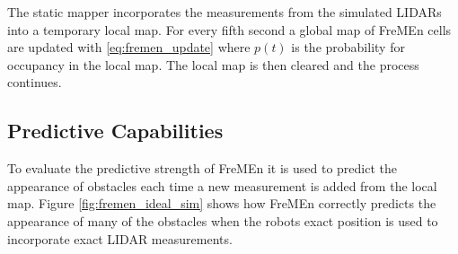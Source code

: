 The static mapper incorporates the measurements from the simulated LIDARs into a temporary local map. 
For every fifth second a global map of FreMEn cells are updated with \ref{eq:fremen_update} where $p(t)$ is the probability for occupancy in the local map. 
The local map is then cleared and the process continues.

\subsection{Predictive Capabilities}
To evaluate the predictive strength of FreMEn it is used to predict the appearance of obstacles each time a new measurement is added from the local map. 
Figure \ref{fig:fremen_ideal_sim} shows how FreMEn correctly predicts the appearance of many of the obstacles when the robots exact position is used to incorporate exact LIDAR measurements. 


